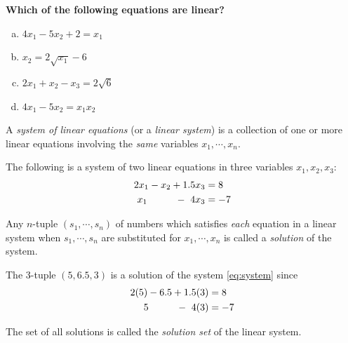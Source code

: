 \documentclass[12pt,letterpaper,reqno]{article}
\numberwithin{equation}{section}
\newcommand{\ti}[1]{\textit{#1}}
\begin{document}
\begin{exercise}
\bf Which of the following equations are linear?
\begin{enumerate}[(a)]
	\item $4x_1-5x_2+2=x_1$
	\item $x_2=2\sqrt{x_1}-6$
	\item $2x_1+x_2-x_3=2\sqrt{6}$ 
	\item $4x_1-5x_2=x_1x_2$ 
\end{enumerate}
\end{exercise}

\begin{defn}\label{eq:system_of_linear_equations}
	A \ti{system of linear equations} (or a \ti{linear system}) is a collection of one or more linear equations involving the \ti{same} variables $x_1, \cdots, x_n$.	
\end{defn}

\begin{example}
The following is a system of two linear equations in three variables $x_1,x_2,x_3$:
\begin{equation}\label{eq:system}
\begin{split}
	2x_1-x_2+1.5x_3&=8 \\
	x_1  \hspace{1.0cm} - \ 4x_3&=-7
\end{split}
\end{equation}	
\end{example}

\begin{defn}[Solution]\label{def:solution}
	Any $n$-tuple $(s_1,\cdots,s_n)$ of numbers which satisfies \ti{each} equation in a linear system when $s_1,\cdots,s_n$ are substituted for $x_1,\cdots,x_n$ is called a \ti{solution} of the system.
\end{defn}

\begin{example}
The 3-tuple $(5,6.5,3)$ is a solution of the system \eqref{eq:system} since
	\begin{equation*}
\begin{split}
	2(5)-6.5+1.5(3)&=8 \\
	5  \hspace{1.0cm} - \ 4(3)&=-7
\end{split}
\end{equation*}	
\end{example}

\begin{defn} \label{def:solution_set}
The set of all solutions is called the \ti{solution set} of the linear system.	
\end{defn}
\end{document}
